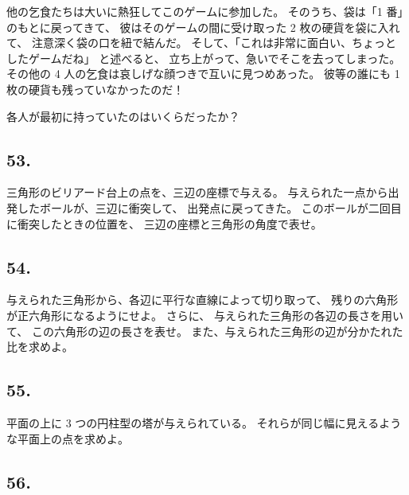 他の乞食たちは大いに熱狂してこのゲームに参加した。
そのうち、袋は「1 番」のもとに戻ってきて、
彼はそのゲームの間に受け取った 2 枚の硬貨を袋に入れて、
注意深く袋の口を紐で結んだ。
そして、「これは非常に面白い、ちょっとしたゲームだね」
と述べると、
立ち上がって、急いでそこを去ってしまった。
その他の 4 人の乞食は哀しげな顔つきで互いに見つめあった。
彼等の誰にも 1 枚の硬貨も残っていなかったのだ！

各人が最初に持っていたのはいくらだったか？

\begin{flushright}
[16/2/89]
\end{flushright}

\subsection*{53.}

三角形のビリアード台上の点を、三辺の座標で与える。
与えられた一点から出発したボールが、三辺に衝突して、
出発点に戻ってきた。
このボールが二回目に衝突したときの位置を、
三辺の座標と三角形の角度で表せ。

\begin{flushright}
[6/4/89]
\end{flushright}

\subsection*{54.}

与えられた三角形から、各辺に平行な直線によって切り取って、
残りの六角形が正六角形になるようにせよ。
さらに、
与えられた三角形の各辺の長さを用いて、
この六角形の辺の長さを表せ。
また、与えられた三角形の辺が分かたれた比を求めよ。

\begin{flushright}
[18/4/86]
\end{flushright}

\subsection*{55.}

平面の上に 3 つの円柱型の塔が与えられている。
それらが同じ幅に見えるような平面上の点を求めよ。

\begin{flushright}
[20/12/74]
\end{flushright}

\subsection*{56.}

